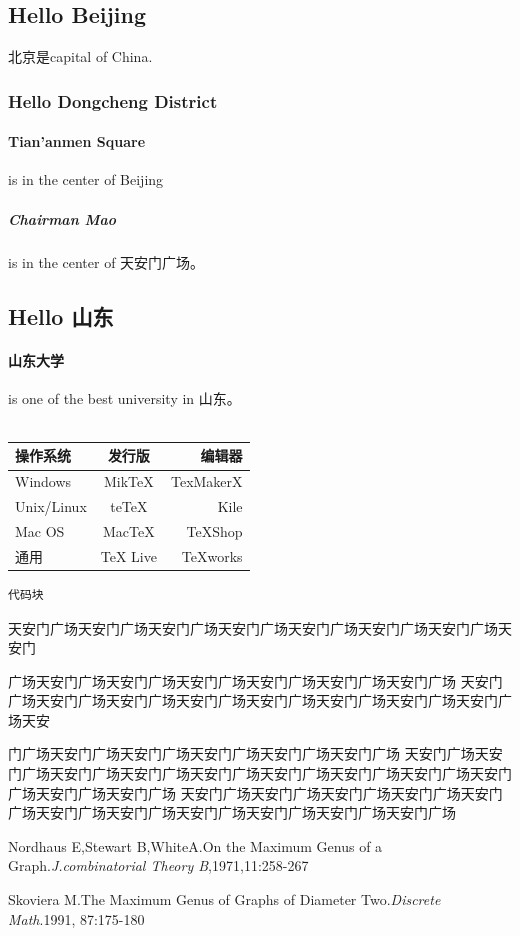 \documentclass[a4paper,left=1.5cm,right=1.5cm,11pt]{article}
\def\hang{\hangindent\parindent}
\def\textindent#1{\indent\llap{#1\enspace}\ignorespaces}
\def\re{\par\hang\textindent}
\begin{document}
\subsection{Hello Beijing}
北京是capital of China.
\subsubsection{Hello Dongcheng District}
\paragraph{Tian'anmen Square}
is in the center of Beijing
\subparagraph{Chairman Mao}
is in the center of 天安门广场。
\subsection{Hello 山东}
\paragraph{山东大学} is one of the best university in 山东。\\\\
\begin{center}
\begin{tabular}{|l|c|r|}
 \hline
操作系统& 发行版& 编辑器\\
 \hline
Windows & MikTeX & TexMakerX \\
 \hline
Unix/Linux & teTeX & Kile \\
 \hline
Mac OS & MacTeX & TeXShop \\
 \hline
通用& TeX Live & TeXworks \\
 \hline
\end{tabular}
\end{center}
\begin{lstlisting}
代码块
\end{lstlisting}
天安门广场天安门广场天安门广场天安门广场天安门广场天安门广场天安门广场天安门\par
广场天安门广场天安门广场天安门广场天安门广场天安门广场天安门广场
天安门广场天安门广场天安门广场天安门广场天安门广场天安门广场天安门广场天安门广场天安\par
门广场天安门广场天安门广场天安门广场天安门广场天安门广场
天安门广场天安门广场天安门广场天安门广场天安门广场天安门广场天安门广场天安门广场天安门广场天安门广场天安门广场
天安门广场天安门广场天安门广场天安门广场天安门广场天安门广场天安门广场天安门广场天安门广场天安门广场天安门广场


\re{[1]} Nordhaus E,Stewart B,WhiteA.On the Maximum Genus of a Graph.{\it J.combinatorial Theory B},1971,11:258-267  
\re{[2]} Skoviera M.The Maximum Genus of Graphs of Diameter Two.{\it Discrete Math}.1991, 87:175-180
\end{document}
